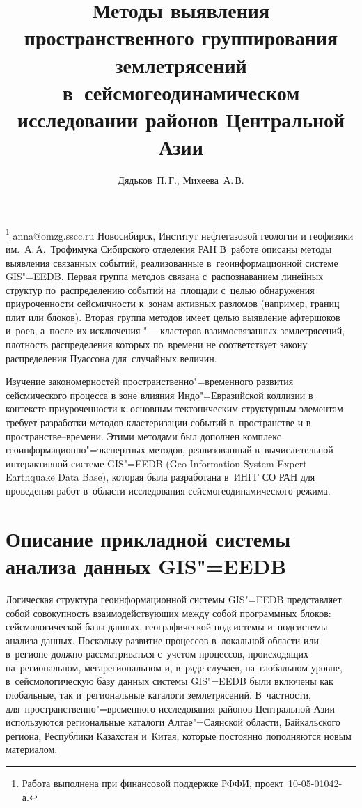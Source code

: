\documentclass[twoside]{article}
\begin{document}
\title
    [Методы выявления группирования землетрясений]
    {Методы выявления пространственного группирования  землетрясений в~сейсмогеодинамическом исследовании районов Центральной Азии}
\author
    {Дядьков~П.\,Г., Михеева~А.\,В.}
\thanks
    {Работа выполнена при финансовой поддержке РФФИ, проект \No\,10-05-01042-а.}
\email
    {anna@omzg.sscc.ru}
\organization
    {Новосибирск, Институт нефтегазовой геологии и геофизики им.\ А.\,А.~Трофимука Сибирского отделения РАН}
\abstract
    {В~работе описаны методы выявления связанных событий, реализованные в~геоинформационной
системе GIS"=EEDB. Первая группа методов связана с~распознаванием линейных структур
по~распределению событий на~площади с~целью обнаружения приуроченности сейсмичности
к~зонам активных разломов (например, границ плит или блоков). Вторая группа методов
имеет целью выявление афтершоков и~роев, а~после их исключения "--- кластеров взаимосвязанных
землетрясений, плотность распределения которых по~времени не соответствует закону
распределения Пуассона для~случайных величин.}
\maketitle

Изучение закономерностей пространственно"=временного развития сейсмического
процесса в зоне влияния Индо"=Евразийской коллизии в контексте приуроченности
к~основным тектоническим струк\-турным элементам требует разработки методов
кластеризации событий в~пространстве и в про\-ст\-ран\-ст\-ве--вре\-ме\-ни.
Этими методами
был дополнен комплекс геоинформационно"=экспертных методов, реализованный в~вычислительной
интерактивной системе GIS"=EEDB (Geo Information System Expert Earthquake Data
Base), которая была разработана в~ИНГГ СО РАН для проведения работ в~области исследования
сейсмогеодинамического режима.

\section{Описание прикладной системы ана\-лиза данных GIS"=EEDB}
Логическая структура геоинформационной сис\-темы GIS"=EEDB представляет собой совокупность
взаимодействующих между собой программных блоков: сейсмологической базы данных,
географи\-ческой подсистемы и~подсистемы анализа данных.
Поскольку развитие процессов
в~локальной об\-ласти или в~регионе должно рассматриваться с~учетом процессов,
происходящих на~региональном, мегарегиональном и, в~ряде случаев, на~глобальном
уровне, в~сейсмологическую базу данных сис\-те\-мы GIS"=EEDB были включены как глобальные,
так и~региональные каталоги землетрясений.
В~частности, для~пространственно"=временного
исследования  районов Центральной Азии используются региональные каталоги Алтае"=Саянской
об\-ласти, Байкальского региона, Республики Казахстан и~Китая, которые постоянно пополняются
\mbox{новым} материалом.
\end{document}

